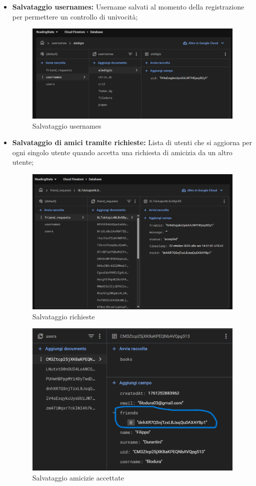 \documentclass{article}
\begin{document}
\begin{itemize}
\begin{itemize}
    \item \textbf{Salvataggio usernames:} Username salvati al momento della registrazione per permettere un controllo di univocità;
    
    \begin{figure}[H]
      \centering
      \includegraphics[width=0.7\linewidth]{usernames.png}
      \caption{Salvataggio usernames}
      \label{fig:sitemap}
    \end{figure}
    
    \item \textbf{Salvataggio di amici tramite richieste:} Lista di utenti che si aggiorna per ogni singolo utente quando accetta una richiesta di amicizia da un altro utente;
    
    \begin{figure}[H]
      \centering
      \includegraphics[width=0.7\linewidth]{requests.png}
      \caption{Salvataggio richieste}
      \label{fig:sitemap}
    \end{figure}

    \begin{figure}[H]
      \centering
      \includegraphics[width=0.7\linewidth]{friends.png}
      \caption{Salvataggio amicizie accettate}
      \label{fig:sitemap}
    \end{figure}


\end{itemize}
\end{itemize}
\end{document}
